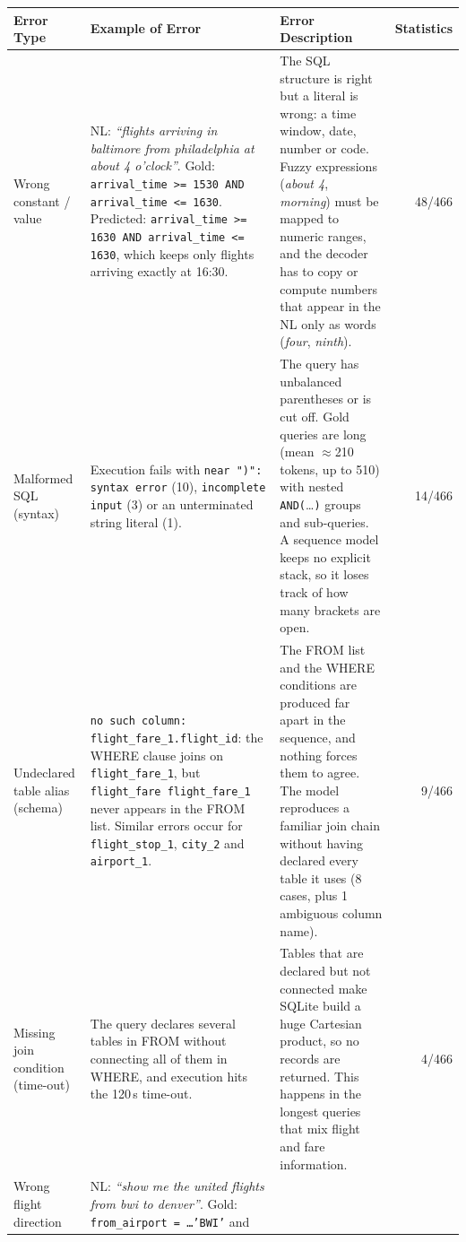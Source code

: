\documentclass[11pt]{article}
\begin{document}
\begin{table}[H]
\centering
\footnotesize
\setlength{\tabcolsep}{4pt}
\begin{tabularx}{\textwidth}{>{\raggedright\arraybackslash}p{1.9cm}>{\raggedright\arraybackslash}X>{\raggedright\arraybackslash}Xr}
\toprule
Error Type & Example of Error & Error Description & Statistics \\
\midrule
Wrong constant / value &
NL: \emph{``flights arriving in baltimore from philadelphia at about 4 o'clock''}.
Gold: \texttt{arrival\_time >= 1530 AND arrival\_time <= 1630}.
Predicted: \texttt{arrival\_time >= 1630 AND arrival\_time <= 1630}, which keeps only flights arriving exactly at 16:30. &
The SQL structure is right but a literal is wrong: a time window, date, number or code. Fuzzy expressions
(\emph{about 4}, \emph{morning}) must be mapped to numeric ranges, and the decoder has to copy or compute numbers
that appear in the NL only as words (\emph{four}, \emph{ninth}). &
48/466 \\
\midrule
Malformed SQL (syntax) &
Execution fails with \texttt{near ")": syntax error} (10), \texttt{incomplete input} (3) or an unterminated string
literal (1). &
The query has unbalanced parentheses or is cut off. Gold queries are long (mean $\approx$210 tokens, up to 510)
with nested \texttt{AND(}\ldots\texttt{)} groups and sub-queries. A sequence model keeps no explicit stack, so it
loses track of how many brackets are open. &
14/466 \\
\midrule
Undeclared table alias (schema) &
\texttt{no such column: flight\_fare\_1.flight\_id}: the WHERE clause joins on \texttt{flight\_fare\_1}, but
\texttt{flight\_fare flight\_fare\_1} never appears in the FROM list. Similar errors occur for \texttt{flight\_stop\_1},
\texttt{city\_2} and \texttt{airport\_1}. &
The FROM list and the WHERE conditions are produced far apart in the sequence, and nothing forces them to agree.
The model reproduces a familiar join chain without having declared every table it uses (8 cases, plus 1
ambiguous column name). &
9/466 \\
\midrule
Missing join condition (time-out) &
The query declares several tables in FROM without connecting all of them in WHERE, and execution hits the 120\,s
time-out. &
Tables that are declared but not connected make SQLite build a huge Cartesian product, so no records are returned.
This happens in the longest queries that mix flight and fare information. &
4/466 \\
\midrule
Wrong flight direction &
NL: \emph{``show me the united flights from bwi to denver''}. Gold: \texttt{from\_airport = \ldots 'BWI'} and

\end{tabularx}
\end{table}
\end{document}
